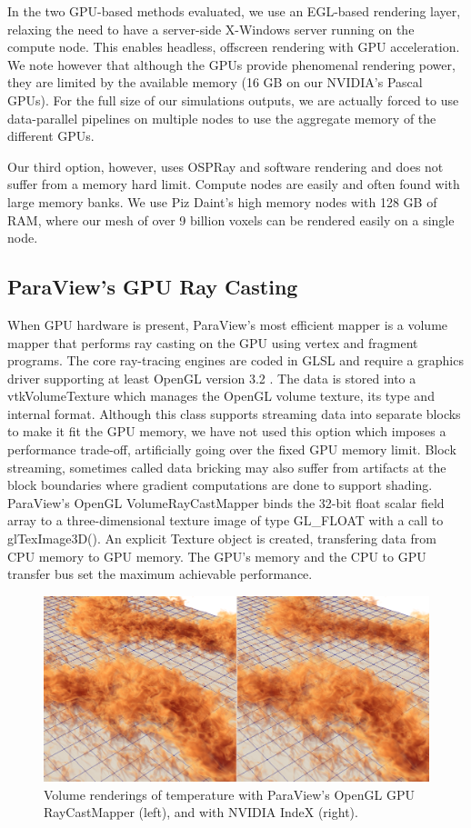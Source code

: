 \documentclass[5p,times]{elsarticle}
\begin{document}
In the two GPU-based methods evaluated, we use an EGL-based rendering layer,
relaxing the need to have a server-side X-Windows server running on the compute node.
This enables headless, offscreen rendering with GPU acceleration. We note however that although
the GPUs provide phenomenal rendering power, they are limited by the available memory
(16 GB on our NVIDIA's Pascal GPUs). For the full size of our simulations outputs,
we are actually forced to use data-parallel pipelines on multiple nodes to use
the aggregate memory of the different GPUs.

Our third option, however, uses OSPRay and software rendering and does not suffer
from a memory hard limit. Compute nodes are easily and often found with large memory
banks. We use Piz Daint's high memory nodes with 128 GB of RAM, where our mesh of
over 9 billion voxels can be rendered easily on a single node.


\subsection{ParaView's GPU Ray Casting} \label{smart}

When GPU hardware is present, ParaView's most efficient mapper is a volume
mapper that performs ray casting on the GPU using vertex and fragment programs.
The core ray-tracing engines are coded in GLSL and require a graphics driver
supporting at least OpenGL version 3.2 \cite{ShadersInVTK}. The data is stored
into a vtkVolumeTexture which manages the OpenGL volume texture, its type and
internal format. Although this class supports streaming data into separate blocks
to make it fit the GPU memory, we have not used this option which imposes
a performance trade-off, artificially going over the fixed GPU memory limit.
Block streaming, sometimes called data bricking may also suffer from artifacts at
the block boundaries where gradient computations are done to support shading.
ParaView's OpenGL VolumeRayCastMapper binds the 32-bit float scalar field array
to a three-dimensional texture image of type GL\_FLOAT with a call to glTexImage3D().
An explicit Texture object is created, transfering data from CPU memory to GPU memory.
The GPU's memory and the CPU to GPU transfer bus set the maximum achievable performance.

\begin{figure}
	\centering
	\includegraphics[width=\linewidth]{fig2}%
	\caption{\label{fig:gpucloseup} Volume renderings of temperature with ParaView's
OpenGL GPU RayCastMapper (left), and with NVIDIA IndeX (right).}
\end{figure}
\end{document}
